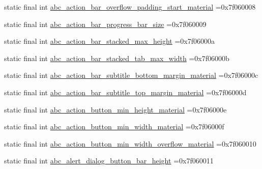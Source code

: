\begin{DoxyCompactItemize}
\item 
static final int \mbox{\hyperlink{classcom_1_1example_1_1trainawearapplication_1_1_r_1_1dimen_ace8d99073001acef949cccae2432fbd1}{abc\+\_\+action\+\_\+bar\+\_\+overflow\+\_\+padding\+\_\+start\+\_\+material}} =0x7f060008
\item 
static final int \mbox{\hyperlink{classcom_1_1example_1_1trainawearapplication_1_1_r_1_1dimen_a4731be12f14e5238f39a1319ef6d924e}{abc\+\_\+action\+\_\+bar\+\_\+progress\+\_\+bar\+\_\+size}} =0x7f060009
\item 
static final int \mbox{\hyperlink{classcom_1_1example_1_1trainawearapplication_1_1_r_1_1dimen_abf3752dba084ac5d62f6043655cfbcdb}{abc\+\_\+action\+\_\+bar\+\_\+stacked\+\_\+max\+\_\+height}} =0x7f06000a
\item 
static final int \mbox{\hyperlink{classcom_1_1example_1_1trainawearapplication_1_1_r_1_1dimen_a1d8f6273f4a913e5b89064871cb00869}{abc\+\_\+action\+\_\+bar\+\_\+stacked\+\_\+tab\+\_\+max\+\_\+width}} =0x7f06000b
\item 
static final int \mbox{\hyperlink{classcom_1_1example_1_1trainawearapplication_1_1_r_1_1dimen_ac82acd650fa4b1033680c8bbfc0e513a}{abc\+\_\+action\+\_\+bar\+\_\+subtitle\+\_\+bottom\+\_\+margin\+\_\+material}} =0x7f06000c
\item 
static final int \mbox{\hyperlink{classcom_1_1example_1_1trainawearapplication_1_1_r_1_1dimen_a5aad8fce1d27682689fe095ace132d2c}{abc\+\_\+action\+\_\+bar\+\_\+subtitle\+\_\+top\+\_\+margin\+\_\+material}} =0x7f06000d
\item 
static final int \mbox{\hyperlink{classcom_1_1example_1_1trainawearapplication_1_1_r_1_1dimen_ac57aaa00a609aa0496d2f374477747a4}{abc\+\_\+action\+\_\+button\+\_\+min\+\_\+height\+\_\+material}} =0x7f06000e
\item 
static final int \mbox{\hyperlink{classcom_1_1example_1_1trainawearapplication_1_1_r_1_1dimen_a0d7eef24a18bdf0e0b435729fe519847}{abc\+\_\+action\+\_\+button\+\_\+min\+\_\+width\+\_\+material}} =0x7f06000f
\item 
static final int \mbox{\hyperlink{classcom_1_1example_1_1trainawearapplication_1_1_r_1_1dimen_a12c68606b6ef847b836603c304496bc7}{abc\+\_\+action\+\_\+button\+\_\+min\+\_\+width\+\_\+overflow\+\_\+material}} =0x7f060010
\item 
static final int \mbox{\hyperlink{classcom_1_1example_1_1trainawearapplication_1_1_r_1_1dimen_adb20347ba70fe3d282fa8e615c4c8042}{abc\+\_\+alert\+\_\+dialog\+\_\+button\+\_\+bar\+\_\+height}} =0x7f060011
\item 

\end{DoxyCompactItemize}
